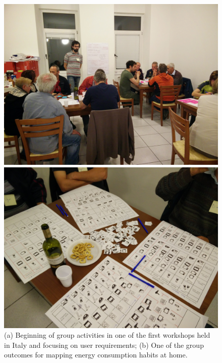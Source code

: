 \begin{figure}
      \begin{center}
        \begin{minipage}[htb]{0.45\linewidth}    
        \includegraphics[width=1\linewidth]{img/Workshop_userreq1.jpg}
        \end{minipage}
 	\hfill 
         \begin{minipage}[htb]{0.45\linewidth}    
	        \includegraphics[width=1\linewidth]{img/Workshop_userreq2.jpg} 
                \end{minipage}
      \end{center}
    \caption{(a) Beginning of group activities in one of the first workshops held in Italy and focusing
    on user requirements; (b) One of the group outcomes for mapping energy consumption habits at home. 
}
\label{fig:workshops}
\end{figure}

